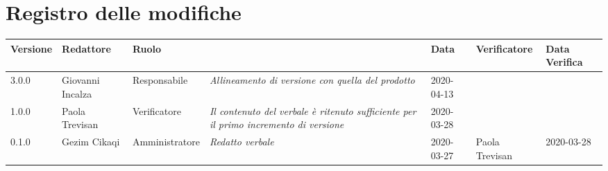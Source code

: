 \section*{Registro delle modifiche}
\renewcommand{\arraystretch}{1.8}

  \setlength\LTleft{-1.7cm}
  \begin{longtable}{|p{1.7cm}|p{2cm}|p{2.5cm}|p{3cm}|p{1.7cm}|p{2cm}|p{2.3cm}|}
    \hline

    \rowcolor{header}
    \textbf{Versione} & \textbf{Redattore} & \textbf{Ruolo} & \centering{\textbf{Descrizione}} & \textbf{Data} & \textbf{Verificatore} & \textbf{Data Verifica}\\

    \hline
    3.0.0 & Giovanni Incalza & Responsabile & \small{\textit{Allineamento di versione con quella del prodotto}} & 2020-04-13 & &\\
    1.0.0 & Paola Trevisan & Verificatore & \small{\textit{Il contenuto del verbale è ritenuto sufficiente per il primo incremento di versione}} & 2020-03-28 & &\\
	0.1.0 & Gezim Cikaqi & Amministratore & \small{\textit{Redatto verbale}} & 2020-03-27 & Paola Trevisan  & 2020-03-28 \\
    \hline
  \end{longtable}
  \setlength\LTleft{0cm}
